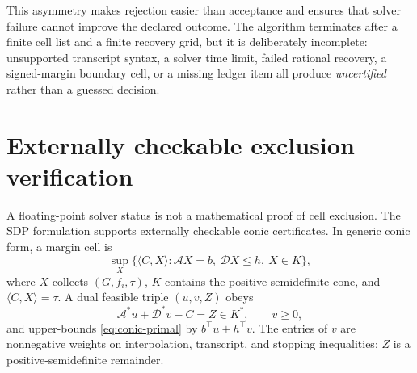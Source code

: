 \documentclass[smallextended]{svjour3}
\newcommand{\ip}[2]{\langle #1,#2\rangle}
\begin{document}
\begin{center}
\end{center}
This asymmetry makes rejection easier than acceptance and ensures that solver
failure cannot improve the declared outcome.  The algorithm terminates after a
finite cell list and a finite recovery grid, but it is deliberately incomplete:
unsupported transcript syntax, a solver time limit, failed rational recovery,
a signed-margin boundary cell, or a missing ledger item all produce
\emph{uncertified} rather than a guessed decision.

\section{Externally checkable exclusion verification}
\label{sec:dual}

A floating-point solver status is not a mathematical proof of cell exclusion.
The SDP formulation supports externally checkable conic certificates.  In
generic conic form, a margin cell is
\begin{equation}
 \sup_X\{\ip{C}{X}:\mathcal A X=b,\ \mathcal D X\leq h,\ X\in K\},
 \label{eq:conic-primal}
\end{equation}
where $X$ collects $(G,f_i,\tau)$, $K$ contains the positive-semidefinite cone,
and $\ip{C}{X}=\tau$.  A dual feasible triple $(u,v,Z)$ obeys
\begin{equation}
 \mathcal A^*u+\mathcal D^*v-C=Z\in K^*,\qquad v\geq0,
 \label{eq:dual-identity}
\end{equation}
and upper-bounds \eqref{eq:conic-primal} by $b^\top u+h^\top v$.
The entries of $v$ are nonnegative weights on interpolation, transcript, and
stopping inequalities; $Z$ is a positive-semidefinite remainder.
\end{document}
